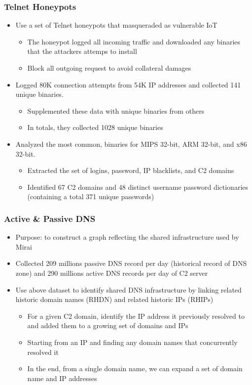 \documentclass{beamer}
\begin{document}
\begin{frame}
	\frametitle{Telnet Honeypots}
	\begin{itemize}
		\item Use a set of Telnet honeypots that masqueraded as vulnerable IoT
		\begin{itemize}
			\item The honeypot logged all incoming traffic and downloaded any binaries that the attackers attemps to install
			\item Block all outgoing request to avoid collateral damages
		\end{itemize}
		\item Logged 80K connection attempts from 54K IP addresses and collected 141 unique binaries.
		\begin{itemize}
			\item Supplemented these data with unique binaries from others
			\item In totals, they collected 1028 unique binaries
		\end{itemize}
		\item Analyzed the most common, binaries for MIPS 32-bit, ARM 32-bit, and x86 32-bit.
		\begin{itemize}
			\item Extracted the set of logins, password, IP blacklists, and C2 domains
			\item Identified 67 C2 domains and 48 distinct username password dictionaries (containing a total 371 unique passwords)
		\end{itemize}
	\end{itemize}
\end{frame}

\begin{frame}
	\frametitle{Active \& Passive DNS}
	\begin{itemize}
		\item Purpose: to construct a graph reflecting the shared infrastructure used by Mirai
		\item Collected 209 millions passive DNS record per day (historical record of DNS zone) and 290 millions active DNS records per day of C2 server
		\item Use above dataset to identify shared DNS infrastructure by linking related historic domain names (RHDN) and related historic IPs (RHIPs)
		\begin{itemize}
			\item For a given C2 domain, identify the IP address it previously resolved to and added them to a growing set of domains and IPs
			\item Starting from an IP and finding any domain names that concurrently resolved it
			\item In the end, from a single domain name, we can expand a set of domain name and IP addresses
		\end{itemize}
	\end{itemize}
\end{frame}
\end{document}
